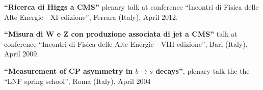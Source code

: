   {\bf ``Ricerca di Higgs a CMS''}
  plenary talk at conference ``Incontri di Fisica delle Alte Energie - XI edizione'',
  Ferrara (Italy), April 2012.

  {\bf ``Misura di W e Z con produzione associata di jet a CMS''}
  talk at conference ``Incontri di Fisica delle Alte Energie - VIII edizione'',
  Bari (Italy), April 2009.

  {\bf ``Measurement of CP asymmetry in $b \rightarrow s$ decays''},
  plenary talk the the ``LNF spring school'', Roma (Italy), April 2004
  \vspace{3mm}
